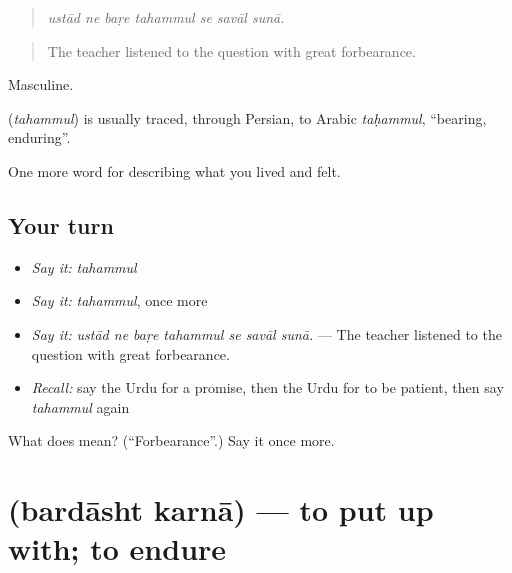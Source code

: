 \begin{quote}
      
\end{quote}

\begin{quote}
\emph{ustād ne baṛe tahammul se savāl sunā.}
\end{quote}

\begin{quote}
The teacher listened to the question with great forbearance.
\end{quote}

Masculine.

\begin{cousinweb}
\textbf{} (\emph{tahammul}) is usually traced, through Persian, to Arabic \emph{taḥammul}, \textquotedblleft{}bearing, enduring\textquotedblright{}.
\end{cousinweb}

\begin{grammarlens}[title={What you've built}]
One more word for describing what you lived and felt.
\end{grammarlens}

\subsection*{Your turn}
\begin{itemize}
\raggedright
  \item \emph{Say it:} \emph{tahammul}
  \item \emph{Say it:} \emph{tahammul}, once more
  \item \emph{Say it:} \emph{ustād ne baṛe tahammul se savāl sunā.} — The teacher listened to the question with great forbearance.
  \item \emph{Recall:} say the Urdu for a promise, then the Urdu for to be patient, then say \emph{tahammul} again
\end{itemize}

\begin{tcolorbox}[breakable,colback=teal!4,colframe=teal!35!black,title={Before you move on}]
What does  mean? (\textquotedblleft{}Forbearance\textquotedblright{}.) Say it once more.
\end{tcolorbox}
\section[\texorpdfstring{\ur{برداشت} \ur{کرنا} (bardāsht karnā)}{برداشت کرنا (bardāsht karnā)}]{  (bardāsht karnā) — to put up with; to endure}

